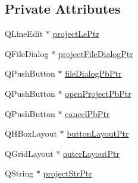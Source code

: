 \subsection*{Private Attributes}
\begin{DoxyCompactItemize}
\item 
Q\-Line\-Edit $\ast$ \hyperlink{class_open_project_gui_ae36ed1a918868075f2cbadb359dafdbb}{project\-Le\-Ptr}
\item 
Q\-File\-Dialog $\ast$ \hyperlink{class_open_project_gui_a897656f67bf72dedd1fca9fe1291b28d}{project\-File\-Dialog\-Ptr}
\item 
Q\-Push\-Button $\ast$ \hyperlink{class_open_project_gui_affa5359b9b61f58f2b6681e5f0d0b243}{file\-Dialog\-Pb\-Ptr}
\item 
Q\-Push\-Button $\ast$ \hyperlink{class_open_project_gui_a4eeebb540cd48483c353106938c97ea3}{open\-Project\-Pb\-Ptr}
\item 
Q\-Push\-Button $\ast$ \hyperlink{class_open_project_gui_a9e9fc184375d14b4ed336470bc06ffb1}{cancel\-Pb\-Ptr}
\item 
Q\-H\-Box\-Layout $\ast$ \hyperlink{class_open_project_gui_abefeff15278c7240eaa8778d15ec21d7}{button\-Layout\-Ptr}
\item 
Q\-Grid\-Layout $\ast$ \hyperlink{class_open_project_gui_ab83addd5cbd6d61872347b850c2d9981}{outer\-Layout\-Ptr}
\item 
Q\-String $\ast$ \hyperlink{class_open_project_gui_aadab89933dc3fe2a0bbdb1f1b7e886b7}{project\-Str\-Ptr}
\end{DoxyCompactItemize}


